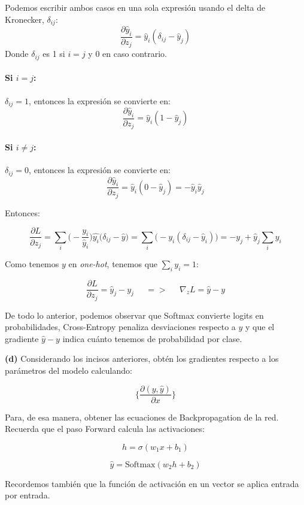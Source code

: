 Podemos escribir ambos casos en una sola expresión usando el delta de Kronecker, $\delta_{ij}$:
\[
\frac{\partial \hat{y}_i}{\partial z_j} = \hat{y}_i(\delta_{ij} - \hat{y}_j)
\]
Donde $\delta_{ij}$ es 1 si $i=j$ y 0 en caso contrario.

\paragraph*{Si $i=j$:}
$\delta_{ij}=1$, entonces la expresión se convierte en:
\[
\frac{\partial \hat{y}_i}{\partial z_j} = \hat{y}_i(1 - \hat{y}_j)
\]

\paragraph*{Si $i \neq j$:}
$\delta_{ij}=0$, entonces la expresión se convierte en:
\[
\frac{\partial \hat{y}_i}{\partial z_j} = \hat{y}_i(0 - \hat{y}_j) = -\hat{y}_i \hat{y}_j
\]

Entonces:

\[
    \frac{\partial L}{\partial z_j} = \sum_{i} \big(- \frac{y_i}{\hat{y}_i}\big) \hat{y_i} \big(\delta_{ij} - \hat{y}\big) = \sum_{i} \big(-y_i (\delta_{ij} - \hat{y}_i)\big) = -y_j + \hat{y}_j \sum_{i} y_i
\]

Como tenemos $y$ en \textit{one-hot}, tenemos que $\sum_{i} y_i = 1$:

\[
    \frac{\partial L}{\partial z_j} = \hat{y}_j - y_j \;\;\;\;\; => \;\;\;\;\; \nabla_z L = \hat{y} - y
\]


De todo lo anterior, podemos observar que Softmax convierte logits en probabilidades, Cross-Entropy penaliza
desviaciones respecto a $y$ y que el gradiente $\hat{y} - y$ indica cuánto tenemos de probabilidad por clase. 



\begin{myblock}
    
    \textbf{(d)} Considerando los incisos anteriores, obtén los gradientes respecto a los parámetros del
    modelo calculando:

    \[
        \bigg\{\frac{\partial (y, \hat{y})}{\partial x} \bigg\}
    \]

    Para, de esa manera, obtener las ecuaciones de Backpropagation de la red. Recuerda que el paso Forward
    calcula las activaciones:

    \[
        h = \sigma(w_1 x + b_1)
    \]

    \[
        \hat{y} = \text{Softmax}(w_2 h + b_2)
    \]

    Recordemos también que la función de activación en un vector se aplica entrada por entrada. 
\end{myblock}


